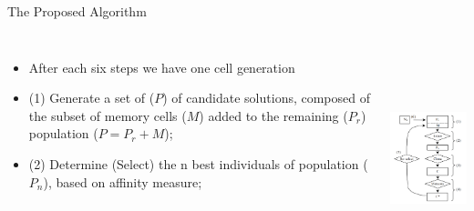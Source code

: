 \begin{frame}{The Proposed Algorithm}
\begin{columns}[c] 
\begin{itemize}
\item{After each six steps we have one cell generation}
\item{(1) Generate a set of (\begin{math} P \end{math}) of candidate solutions, composed of the subset of memory cells  (\begin{math} M \end{math}) added to the remaining (\begin{math} P_r \end{math}) population (\begin{math} P = P_r + M \end{math});}
\item{(2) Determine (Select) the n best individuals of population (\begin{math} P_n \end{math}), based on affinity measure;}
\end{itemize}
\includegraphics[height=6.5cm]{img/cj_block_diagram_CSA.png}
\end{columns}
\end{frame}


